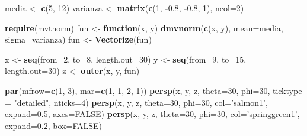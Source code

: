 \documentclass[10pt,]{krantz}
\makeatletter
\newenvironment{Shaded}{\begin{snugshade}}{\end{snugshade}}
\newcommand{\KeywordTok}[1]{\textcolor[rgb]{0.13,0.29,0.53}{\textbf{#1}}}
\newcommand{\DataTypeTok}[1]{\textcolor[rgb]{0.13,0.29,0.53}{#1}}
\newcommand{\DecValTok}[1]{\textcolor[rgb]{0.00,0.00,0.81}{#1}}
\newcommand{\FloatTok}[1]{\textcolor[rgb]{0.00,0.00,0.81}{#1}}
\newcommand{\StringTok}[1]{\textcolor[rgb]{0.31,0.60,0.02}{#1}}
\newcommand{\OtherTok}[1]{\textcolor[rgb]{0.56,0.35,0.01}{#1}}
\newcommand{\ControlFlowTok}[1]{\textcolor[rgb]{0.13,0.29,0.53}{\textbf{#1}}}
\newcommand{\OperatorTok}[1]{\textcolor[rgb]{0.81,0.36,0.00}{\textbf{#1}}}
\newcommand{\NormalTok}[1]{#1}
\newenvironment{kframe}{%
\medskip{}
\setlength{\fboxsep}{.8em}
 \def\at@end@of@kframe{}%
 \ifinner\ifhmode%
  \def\at@end@of@kframe{\end{minipage}}%
  \begin{minipage}{\columnwidth}%
 \fi\fi%
 \def\FrameCommand##1{\hskip\@totalleftmargin \hskip-\fboxsep
 \colorbox{shadecolor}{##1}\hskip-\fboxsep
     \hskip-\linewidth \hskip-\@totalleftmargin \hskip\columnwidth}%
 \MakeFramed {\advance\hsize-\width
   \@totalleftmargin\z@ \linewidth\hsize
   \@setminipage}}%
 {\par\unskip\endMakeFramed%
 \at@end@of@kframe}
\renewenvironment{Shaded}{\begin{kframe}}{\end{kframe}}
\makeatother
\begin{document}
\begin{Shaded}
\begin{Highlighting}[]
\NormalTok{media <-}\StringTok{ }\KeywordTok{c}\NormalTok{(}\DecValTok{5}\NormalTok{, }\DecValTok{12}\NormalTok{)}
\NormalTok{varianza <-}\StringTok{ }\KeywordTok{matrix}\NormalTok{(}\KeywordTok{c}\NormalTok{(}\DecValTok{1}\NormalTok{, }\OperatorTok{-}\FloatTok{0.8}\NormalTok{, }\OperatorTok{-}\FloatTok{0.8}\NormalTok{, }\DecValTok{1}\NormalTok{), }\DataTypeTok{ncol=}\DecValTok{2}\NormalTok{)}

\KeywordTok{require}\NormalTok{(mvtnorm)}
\NormalTok{fun <-}\StringTok{ }\ControlFlowTok{function}\NormalTok{(x, y) }\KeywordTok{dmvnorm}\NormalTok{(}\KeywordTok{c}\NormalTok{(x, y), }\DataTypeTok{mean=}\NormalTok{media, }\DataTypeTok{sigma=}\NormalTok{varianza)}
\NormalTok{fun <-}\StringTok{ }\KeywordTok{Vectorize}\NormalTok{(fun)}

\NormalTok{x <-}\StringTok{ }\KeywordTok{seq}\NormalTok{(}\DataTypeTok{from=}\DecValTok{2}\NormalTok{, }\DataTypeTok{to=}\DecValTok{8}\NormalTok{, }\DataTypeTok{length.out=}\DecValTok{30}\NormalTok{)}
\NormalTok{y <-}\StringTok{ }\KeywordTok{seq}\NormalTok{(}\DataTypeTok{from=}\DecValTok{9}\NormalTok{, }\DataTypeTok{to=}\DecValTok{15}\NormalTok{, }\DataTypeTok{length.out=}\DecValTok{30}\NormalTok{)}
\NormalTok{z <-}\StringTok{ }\KeywordTok{outer}\NormalTok{(x, y, fun)}

\KeywordTok{par}\NormalTok{(}\DataTypeTok{mfrow=}\KeywordTok{c}\NormalTok{(}\DecValTok{1}\NormalTok{, }\DecValTok{3}\NormalTok{), }\DataTypeTok{mar=}\KeywordTok{c}\NormalTok{(}\DecValTok{1}\NormalTok{, }\DecValTok{1}\NormalTok{, }\DecValTok{2}\NormalTok{, }\DecValTok{1}\NormalTok{))}
\KeywordTok{persp}\NormalTok{(x, y, z, }\DataTypeTok{theta=}\DecValTok{30}\NormalTok{, }\DataTypeTok{phi=}\DecValTok{30}\NormalTok{, }\DataTypeTok{ticktype =} \StringTok{"detailed"}\NormalTok{, }\DataTypeTok{nticks=}\DecValTok{4}\NormalTok{)}
\KeywordTok{persp}\NormalTok{(x, y, z, }\DataTypeTok{theta=}\DecValTok{30}\NormalTok{, }\DataTypeTok{phi=}\DecValTok{30}\NormalTok{, }\DataTypeTok{col=}\StringTok{'salmon1'}\NormalTok{, }\DataTypeTok{expand=}\FloatTok{0.5}\NormalTok{, }\DataTypeTok{axes=}\OtherTok{FALSE}\NormalTok{)}
\KeywordTok{persp}\NormalTok{(x, y, z, }\DataTypeTok{theta=}\DecValTok{30}\NormalTok{, }\DataTypeTok{phi=}\DecValTok{30}\NormalTok{, }\DataTypeTok{col=}\StringTok{'springgreen1'}\NormalTok{, }\DataTypeTok{expand=}\FloatTok{0.2}\NormalTok{, }\DataTypeTok{box=}\OtherTok{FALSE}\NormalTok{)}
\end{Highlighting}
\end{Shaded}
\end{document}
